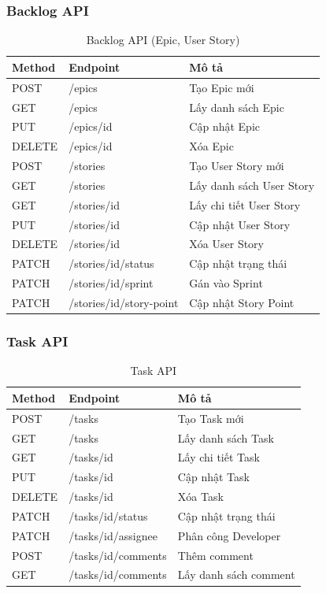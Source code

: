\documentclass[12pt,a4paper]{report}
\begin{document}
\subsubsection{Backlog API}

\begin{table}[H]
\centering
\caption{Backlog API (Epic, User Story)}
\begin{tabular}{|p{2.5cm}|p{4cm}|p{8cm}|}
\hline
\textbf{Method} & \textbf{Endpoint} & \textbf{Mô tả} \\
\hline
POST & /epics & Tạo Epic mới \\
\hline
GET & /epics & Lấy danh sách Epic \\
\hline
PUT & /epics/{id} & Cập nhật Epic \\
\hline
DELETE & /epics/{id} & Xóa Epic \\
\hline
POST & /stories & Tạo User Story mới \\
\hline
GET & /stories & Lấy danh sách User Story \\
\hline
GET & /stories/{id} & Lấy chi tiết User Story \\
\hline
PUT & /stories/{id} & Cập nhật User Story \\
\hline
DELETE & /stories/{id} & Xóa User Story \\
\hline
PATCH & /stories/{id}/status & Cập nhật trạng thái \\
\hline
PATCH & /stories/{id}/sprint & Gán vào Sprint \\
\hline
PATCH & /stories/{id}/story-point & Cập nhật Story Point \\
\hline
\end{tabular}
\label{tab:backlog_api}
\end{table}

\subsubsection{Task API}

\begin{table}[H]
\centering
\caption{Task API}
\begin{tabular}{|p{2.5cm}|p{4cm}|p{8cm}|}
\hline
\textbf{Method} & \textbf{Endpoint} & \textbf{Mô tả} \\
\hline
POST & /tasks & Tạo Task mới \\
\hline
GET & /tasks & Lấy danh sách Task \\
\hline
GET & /tasks/{id} & Lấy chi tiết Task \\
\hline
PUT & /tasks/{id} & Cập nhật Task \\
\hline
DELETE & /tasks/{id} & Xóa Task \\
\hline
PATCH & /tasks/{id}/status & Cập nhật trạng thái \\
\hline
PATCH & /tasks/{id}/assignee & Phân công Developer \\
\hline
POST & /tasks/{id}/comments & Thêm comment \\
\hline
GET & /tasks/{id}/comments & Lấy danh sách comment \\
\hline
\end{tabular}
\label{tab:task_api}
\end{table}
\end{document}
